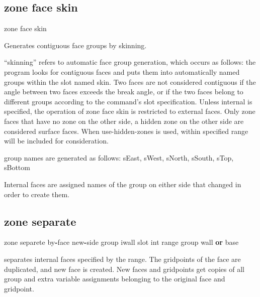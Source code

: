 \documentclass[a4paper, nobind]{templates/ociamthesis}
\newenvironment{Shaded}{\begin{snugshade}}{\end{snugshade}}
\newcommand{\BuiltInTok}[1]{#1}
\newcommand{\KeywordTok}[1]{\textcolor[rgb]{0.13,0.29,0.53}{\textbf{#1}}}
\newcommand{\NormalTok}[1]{#1}
\newcommand{\OperatorTok}[1]{\textcolor[rgb]{0.81,0.36,0.00}{\textbf{#1}}}
\newcommand{\StringTok}[1]{\textcolor[rgb]{0.31,0.60,0.02}{#1}}
\renewenvironment{Shaded}
{
  \vspace{10pt}%
  \begin{snugshade}%
}{%
  \end{snugshade}%
  \vspace{8pt}%
}
\begin{document}
\hypertarget{zone-face-skin}{%
\subsection{zone face skin}\label{zone-face-skin}}

\begin{Shaded}
\begin{Highlighting}[]
\NormalTok{zone face skin}
\end{Highlighting}
\end{Shaded}

Generates contiguous face groups by skinning.

``skinning'' refers to automatic face group generation, which occurs as
follows: the program looks for contiguous faces and puts them into
automatically named groups within the slot named skin. Two faces are not
considered contiguous if the angle between two faces exceeds the break
angle, or if the two faces belong to different groups according to the
command's slot specification. Unless internal is specified, the
operation of zone face skin is restricted to external faces. Only zone
faces that have no zone on the other side, a hidden zone on the other
side are considered surface faces. When use-hidden-zones is used, within
specified range will be included for consideration.

group names are generated as follows: sEast, sWest, sNorth, sSouth,
sTop, sBottom

Internal faces are assigned names of the group on either side that
changed in order to create them.

\hypertarget{zone-separate}{%
\subsection{zone separate}\label{zone-separate}}

\begin{Shaded}
\begin{Highlighting}[]
\NormalTok{zone separete by}\OperatorTok{{-}}\NormalTok{face new}\OperatorTok{{-}}\NormalTok{side group }\StringTok{\textquotesingle{}iwall\textquotesingle{}}\NormalTok{ slot }\StringTok{\textquotesingle{}int\textquotesingle{}} \BuiltInTok{range}\NormalTok{ group }\StringTok{\textquotesingle{}wall\textquotesingle{}} \KeywordTok{or} \StringTok{\textquotesingle{}base\textquotesingle{}}
\end{Highlighting}
\end{Shaded}

separates internal faces specified by the range. The gridpoints of the
face are duplicated, and new face is created. New faces and gridpoints
get copies of all group and extra variable assignments belonging to the
original face and gridpoint.
\end{document}
